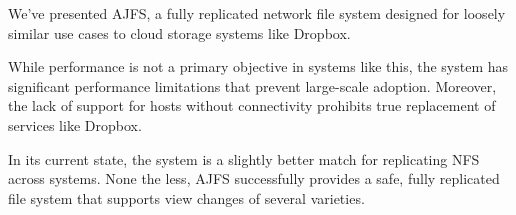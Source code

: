 
We've presented AJFS, a fully replicated network file system designed for
loosely similar use cases to cloud storage systems like Dropbox.

While performance is not a primary objective in systems like this, the system
has significant performance limitations that prevent large-scale adoption.
Moreover, the lack of support for hosts without connectivity prohibits
true replacement of services like Dropbox.

In its current state, the system is a slightly better match for replicating NFS
across systems. None the less, AJFS successfully provides a safe, fully
replicated file system that supports view changes of several varieties.


